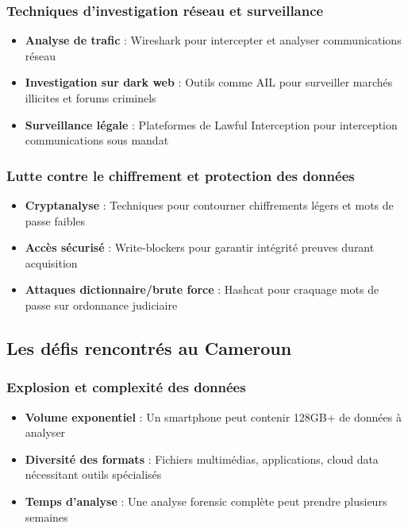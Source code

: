 \documentclass[12pt,a4paper]{article}
\begin{document}
\subsubsection{Techniques d'investigation réseau et surveillance}
\begin{itemize}[leftmargin=*]
    \item \textbf{Analyse de trafic} : Wireshark pour intercepter et analyser communications réseau
    \item \textbf{Investigation sur dark web} : Outils comme AIL pour surveiller marchés illicites et forums criminels
    \item \textbf{Surveillance légale} : Plateformes de Lawful Interception pour interception communications sous mandat
\end{itemize}

\subsubsection{Lutte contre le chiffrement et protection des données}
\begin{itemize}[leftmargin=*]
    \item \textbf{Cryptanalyse} : Techniques pour contourner chiffrements légers et mots de passe faibles
    \item \textbf{Accès sécurisé} : Write-blockers pour garantir intégrité preuves durant acquisition
    \item \textbf{Attaques dictionnaire/brute force} : Hashcat pour craquage mots de passe sur ordonnance judiciaire
\end{itemize}

\subsection{Les défis rencontrés au Cameroun}

\subsubsection{Explosion et complexité des données}
\begin{itemize}[leftmargin=*]
    \item \textbf{Volume exponentiel} : Un smartphone peut contenir 128GB+ de données à analyser
    \item \textbf{Diversité des formats} : Fichiers multimédias, applications, cloud data nécessitant outils spécialisés
    \item \textbf{Temps d'analyse} : Une analyse forensic complète peut prendre plusieurs semaines
\end{itemize}
\end{document}
